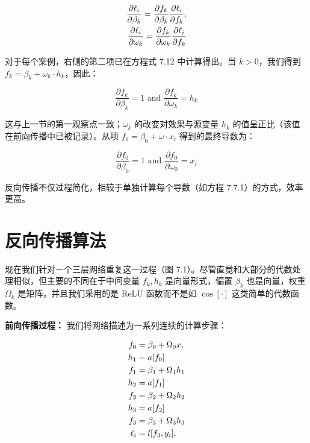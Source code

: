\begin{align}
\frac{\partial \ell_i}{\partial \beta_k} = \frac{\partial f_k}{\partial \beta_k} \frac{\partial \ell_i}{\partial f_k}, \notag \\
\frac{\partial \ell_i}{\partial \omega_k} = \frac{\partial f_k}{\partial \omega_k} \frac{\partial \ell_i}{\partial f_k} 
\end{align}

对于每个案例，右侧的第二项已在方程式 7.12 中计算得出。当 \(k > 0\)，我们得到 \(f_k = \beta_k + \omega_k \cdot h_k\)，因此：

\begin{equation}
\frac{\partial f_k}{\partial \beta_k} = 1 \text{ and } \frac{\partial f_k}{\partial \omega_k} = h_k 
\end{equation}


这与上一节的第一观察点一致；\(\omega_k\) 的改变对效果与源变量 \(h_k\) 的值呈正比（该值在前向传播中已被记录）。从项 \(f_0 = \beta_0 + \omega \cdot x_i\) 得到的最终导数为：

\begin{equation}
\frac{\partial f_0}{\partial \beta_0} = 1 \text{ and } \frac{\partial f_0}{\partial \omega_0} = x_i 
\end{equation}

反向传播不仅过程简化，相较于单独计算每个导数（如方程 7.7.1）的方式，效率更高。

\section{反向传播算法}
现在我们针对一个三层网络重复这一过程（图 7.1）。尽管直觉和大部分的代数处理相似，但主要的不同在于中间变量 \(f_k, h_k\) 是向量形式，偏置 \(\beta_k\) 也是向量，权重 \(\Omega_k\) 是矩阵，并且我们采用的是 ReLU 函数而不是如 \(\cos[\cdot]\) 这类简单的代数函数。

\textbf{前向传播过程：} 我们将网络描述为一系列连续的计算步骤：


\begin{align}
f_0 &= \beta_0 + \Omega_0x_i \notag \\
h_1 &= a[f_0] \notag \\
f_1 &= \beta_1 + \Omega_1h_1 \notag \\
h_2 &= a[f_1] \notag \\
f_2 &= \beta_2 + \Omega_2h_2 \notag \\
h_3 &= a[f_2] \notag \\
f_3 &= \beta_3 + \Omega_3h_3 \notag \\
\ell_i &= l[f_3, y_i], 
\end{align} 


